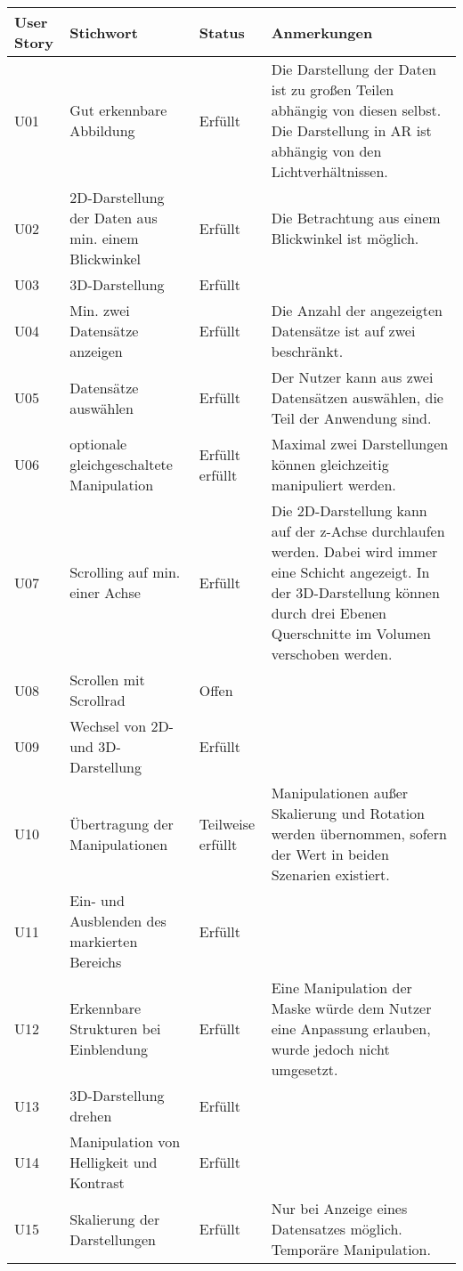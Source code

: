 \begin{longtable} {p{}p{}p{}p{}}
\toprule
User Story & Stichwort & Status & Anmerkungen \\
\toprule
U01 & Gut erkennbare Abbildung & Erfüllt & Die Darstellung der Daten ist zu großen Teilen abhängig von diesen selbst. Die Darstellung in AR ist abhängig von den Lichtverhältnissen.\\
\midrule 
U02 & 2D-Darstellung der Daten aus min. einem Blickwinkel & Erfüllt & Die Betrachtung aus einem Blickwinkel ist möglich.\\
\midrule 
U03 & 3D-Darstellung & Erfüllt & \\
\midrule 
U04 & Min. zwei Datensätze anzeigen & Erfüllt & Die Anzahl der angezeigten Datensätze ist auf zwei beschränkt.\\
\midrule 
U05 & Datensätze auswählen & Erfüllt & Der Nutzer kann aus zwei Datensätzen auswählen, die Teil der Anwendung sind.\\
\midrule
U06 & optionale gleichgeschaltete Manipulation & Erfüllt erfüllt & Maximal zwei Darstellungen können gleichzeitig manipuliert werden. \\
\midrule 
U07 & Scrolling auf min. einer Achse & Erfüllt & Die 2D-Darstellung kann auf der z-Achse durchlaufen werden. Dabei wird immer eine Schicht angezeigt. In der 3D-Darstellung können durch drei Ebenen Querschnitte im Volumen verschoben werden.\\
\midrule 
U08 & Scrollen mit Scrollrad & Offen & \\
\midrule 
U09 & Wechsel von 2D- und 3D-Darstellung & Erfüllt & \\
\midrule 
U10 & Übertragung der Manipulationen & Teilweise erfüllt & Manipulationen außer Skalierung und Rotation werden übernommen, sofern der Wert in beiden Szenarien existiert.\\
\midrule 
U11  & Ein- und Ausblenden des markierten Bereichs & Erfüllt & \\
\midrule
U12 & Erkennbare Strukturen bei Einblendung & Erfüllt & Eine Manipulation der Maske würde dem Nutzer eine Anpassung erlauben, wurde jedoch nicht umgesetzt.\\
\midrule 
U13 & 3D-Darstellung drehen & Erfüllt & \\
\midrule 
U14 & Manipulation von Helligkeit und Kontrast & Erfüllt & \\
\midrule 
U15 & Skalierung der Darstellungen & Erfüllt & Nur bei Anzeige eines Datensatzes möglich. Temporäre Manipulation.\\

\end{longtable}
